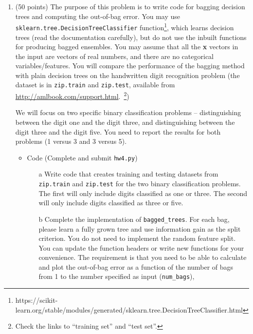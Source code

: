\documentclass[11pt]{article}
\begin{document}
\begin{enumerate}

\item (50 points) The purpose of this problem is to write code for bagging decision trees and computing the out-of-bag error.
You may use \texttt{sklearn.tree.DecisionTreeClassifier} function\footnote{https://scikit-learn.org/stable/modules/generated/sklearn.tree.DecisionTreeClassifier.html}, which learns decision trees (read the documentation carefully), but do not use the inbuilt functions for producing bagged ensembles. 
You may assume that all the \textbf{x} vectors in the input are vectors of real numbers, and there are no categorical variables/features. You will compare the performance of the bagging method with plain decision trees on the handwritten digit recognition problem (the dataset is in \texttt{zip.train} and \texttt{zip.test},
available from \url{http://amlbook.com/support.html}.~\footnote{Check the links to ``training set'' and ``test set''.})

We will focus on two specific binary classification problems -- distinguishing between the digit one and the digit three, and distinguishing between the digit three and the digit five. You need to report the results for both problems (1 versus 3 and 3 versus 5).

\begin{itemize}
    \item Code (Complete and submit \texttt{hw4.py})
    \begin{itemize}
        \item[a] Write code that creates training and testing datasets from \texttt{zip.train} and \texttt{zip.test} 
        for the two binary classification problems. 
        The first will only include digits classified as one or three. 
        The second will only include digits classified as three or five. 
        
        \item[b] Complete the implementation of \texttt{bagged\_trees}. 
        For each bag, please learn a fully grown tree and use information gain as the split criterion.
        You do not need to implement the random feature split.
        You can update the function headers or write new functions for your convenience. 
        The requirement is that you need to be able to calculate and plot the out-of-bag error as a function of the number of bags from 1 to the number specified as input (\texttt{num\_bags}), 


\end{itemize}
\end{itemize}
\end{enumerate}
\end{document}
